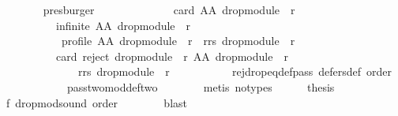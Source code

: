 \begin{isabellebody}
\ \ \ \ \ \ \isamarkupfalse%
\ presburger\isanewline
\ \ \ \ \isamarkupfalse%
\isanewline
\ \ \ \ \ \ {\isachardoublequoteopen}{\isasymnot}\ {}\ {\isasymle}\ card\ {\isacharparenleft}{\kern0pt}AA\ {\isacharparenleft}{\kern0pt}drop{\isacharunderscore}{\kern0pt}module\ {}\ r{\isacharparenright}{\kern0pt}\ {}{\isacharparenright}{\kern0pt}\ {\isasymor}\isanewline
\ \ \ \ \ \ \ \ \ \ infinite\ {\isacharparenleft}{\kern0pt}AA\ {\isacharparenleft}{\kern0pt}drop{\isacharunderscore}{\kern0pt}module\ {}\ r{\isacharparenright}{\kern0pt}\ {}{\isacharparenright}{\kern0pt}\ {\isasymor}\isanewline
\ \ \ \ \ \ \ \ \ \ {\isasymnot}\ profile\ {\isacharparenleft}{\kern0pt}AA\ {\isacharparenleft}{\kern0pt}drop{\isacharunderscore}{\kern0pt}module\ {}\ r{\isacharparenright}{\kern0pt}\ {}{\isacharparenright}{\kern0pt}\ {\isacharparenleft}{\kern0pt}rrs\ {\isacharparenleft}{\kern0pt}drop{\isacharunderscore}{\kern0pt}module\ {}\ r{\isacharparenright}{\kern0pt}\ {}{\isacharparenright}{\kern0pt}\ {\isasymor}\isanewline
\ \ \ \ \ \ \ \ \ \ card\ {\isacharparenleft}{\kern0pt}reject\ {\isacharparenleft}{\kern0pt}drop{\isacharunderscore}{\kern0pt}module\ {}\ r{\isacharparenright}{\kern0pt}\ {\isacharparenleft}{\kern0pt}AA\ {\isacharparenleft}{\kern0pt}drop{\isacharunderscore}{\kern0pt}module\ {}\ r{\isacharparenright}{\kern0pt}\ {}{\isacharparenright}{\kern0pt}\isanewline
\ \ \ \ \ \ \ \ \ \ \ \ \ \ {\isacharparenleft}{\kern0pt}rrs\ {\isacharparenleft}{\kern0pt}drop{\isacharunderscore}{\kern0pt}module\ {}\ r{\isacharparenright}{\kern0pt}\ {}{\isacharparenright}{\kern0pt}{\isacharparenright}{\kern0pt}\ {\isacharequal}{\kern0pt}\ {}{\isachardoublequoteclose}\isanewline
\ \ \ \ \ \ \isamarkupfalse%
\ rej{\isacharunderscore}{\kern0pt}drop{\isacharunderscore}{\kern0pt}eq{\isacharunderscore}{\kern0pt}def{\isacharunderscore}{\kern0pt}pass\ defers{\isacharunderscore}{\kern0pt}def\ order\isanewline
\ \ \ \ \ \ \ \ \ \ \ \ pass{\isacharunderscore}{\kern0pt}two{\isacharunderscore}{\kern0pt}mod{\isacharunderscore}{\kern0pt}def{\isacharunderscore}{\kern0pt}two\isanewline
\ \ \ \ \ \ \isamarkupfalse%
\ {\isacharparenleft}{\kern0pt}metis\ {\isacharparenleft}{\kern0pt}no{\isacharunderscore}{\kern0pt}types{\isacharparenright}{\kern0pt}{\isacharparenright}{\kern0pt}\isanewline
\ \ \ \ \isamarkupfalse%
\ {\isacharquery}{\kern0pt}thesis\isanewline
\ \ \ \ \ \ \isamarkupfalse%
\ f{}\ drop{\isacharunderscore}{\kern0pt}mod{\isacharunderscore}{\kern0pt}sound\ order\isanewline
\ \ \ \ \ \ \isamarkupfalse%
\ blast\isanewline
\ \ \isamarkupfalse%
\isanewline
{}\isamarkupfalse%
%
\endisatagproof
{\isafoldproof}%
%
\isadelimproof
\isanewline
%
\endisadelimproof
%
\isadelimtheory
\isanewline
%
\endisadelimtheory
%
\isatagtheory
{}\isamarkupfalse%
%
\endisatagtheory
{\isafoldtheory}%
%
\isadelimtheory
%
\endisadelimtheory
%
\end{isabellebody}%
